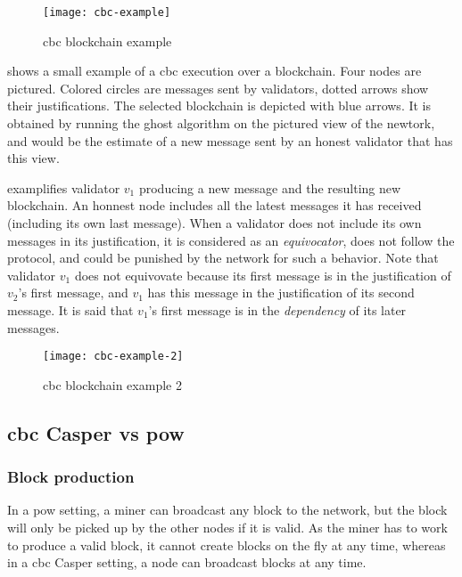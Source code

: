 \begin{figure}[h]
	\centering
	\texttt{[image: cbc-example]}
  \captionsetup{justification=centering}
    \caption{\gls{cbc} blockchain example}
	\label{fig:example}
\end{figure}

 shows a small example of a \gls{cbc} execution
over a blockchain. Four nodes are pictured. Colored circles are messages sent by
validators, dotted arrows show their justifications. The selected blockchain is
depicted with blue arrows. It is obtained by running the \gls{ghost} algorithm
on the pictured view of the newtork, and would be the estimate of a new message
sent by an honest validator that has this view.

 examplifies validator \(v_1\) producing a new message
and the resulting new blockchain. An honnest node includes all the latest
messages it has received (including its own last message). When a validator does
not include its own messages in its justification, it is considered as an
\textit{equivocator}, does not follow the protocol, and could be punished by
the network for such a behavior. Note that validator \(v_1\) does not equivovate
because its first message is in the justification of \(v_2\)'s first message,
and \(v_1\) has this message in the justification of its second message. It is
said that \(v_1\)'s first message is in the \textit{dependency} of its later
messages.

\begin{figure}[h]
	\centering
	\texttt{[image: cbc-example-2]}
  \captionsetup{justification=centering}
    \caption{\gls{cbc} blockchain example 2}
	\label{fig:example2}
\end{figure}


\FloatBarrier
\subsection{\gls{cbc} Casper vs \gls{pow}}
\label{ssec:powVsPos}

\subsubsection{Block production}
In a \gls{pow} setting, a miner can broadcast any block to the network, but the
block will only be picked up by the other nodes if it is valid. As the miner has
to work to produce a valid block, it cannot create blocks on the fly at any
time, whereas in a \gls{cbc} Casper setting, a node can broadcast blocks at any
time. 

